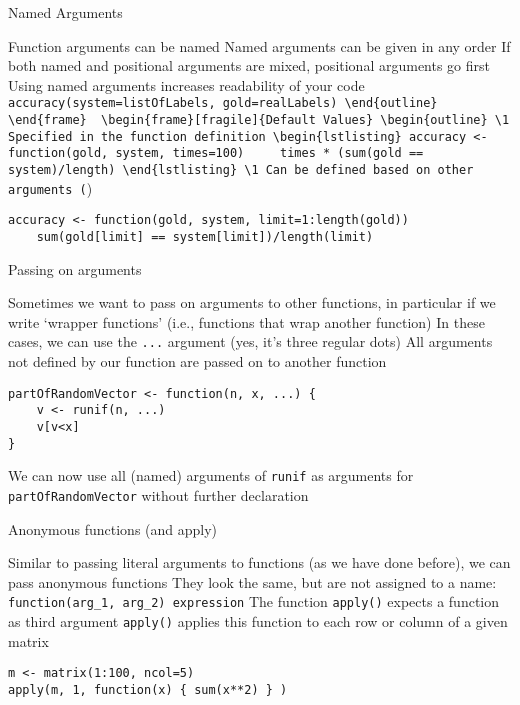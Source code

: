 \documentclass[aspectratio=169]{beamer}
\begin{document}
\begin{frame}[fragile]{Named Arguments}
\begin{outline}
\1 Function arguments can be named
\1 Named arguments can be given in any order
\2 If both named and positional arguments are mixed, positional arguments go first
\1 Using named arguments increases readability of your code \\
\lstinline!accuracy(system=listOfLabels, gold=realLabels)
\end{outline}
\end{frame}

\begin{frame}[fragile]{Default Values}
\begin{outline}
\1 Specified in the function definition
\begin{lstlisting}
accuracy <- function(gold, system, times=100)
    times * (sum(gold == system)/length)
\end{lstlisting}
\1 Can be defined based on other arguments (!)
\begin{lstlisting}
accuracy <- function(gold, system, limit=1:length(gold))
    sum(gold[limit] == system[limit])/length(limit)
\end{lstlisting}
\end{outline}
\end{frame}

\begin{frame}[fragile]{Passing on arguments}
\begin{outline}
\1 Sometimes we want to pass on arguments to other functions, in particular if we write `wrapper functions' (i.e., functions that wrap another function)
\1 In these cases, we can use the \lstinline!...! argument (yes, it's three regular dots)
\1 All arguments not defined by our function are passed on to another function
\end{outline}
\begin{lstlisting}
partOfRandomVector <- function(n, x, ...) {
    v <- runif(n, ...)
    v[v<x]
}
\end{lstlisting}
We can now use all (named) arguments of \lstinline!runif! as arguments for \lstinline!partOfRandomVector! without further declaration
\end{frame}

\begin{frame}[fragile]{Anonymous functions (and apply)}
\begin{outline}
\1 Similar to passing literal arguments to functions (as we have done before), we can pass anonymous functions
\1 They look the same, but are not assigned to a name: \lstinline!function(arg_1, arg_2) expression!
\1 The function \lstinline!apply()! expects a function as third argument
\2 \lstinline!apply()! applies this function to each row or column of a given matrix
\end{outline}
\begin{example}
\begin{lstlisting}
m <- matrix(1:100, ncol=5)
apply(m, 1, function(x) { sum(x**2) } )
\end{lstlisting}
\end{example}
\end{frame}
\end{document}
